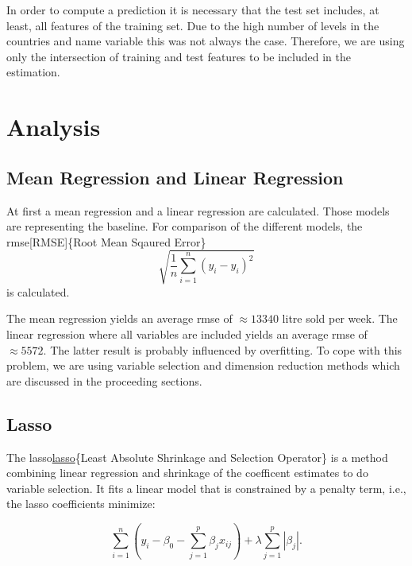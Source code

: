 \documentclass[11pt,]{article}
\begin{document}
In order to compute a prediction it is necessary that the test set
includes, at least, all features of the training set. Due to the high
number of levels in the countries and name variable this was not always
the case. Therefore, we are using only the intersection of training and
test features to be included in the estimation.

\hypertarget{analysis}{%
\section{Analysis}\label{analysis}}

\hypertarget{mean-regression-and-linear-regression}{%
\subsection{Mean Regression and Linear
Regression}\label{mean-regression-and-linear-regression}}

At first a mean regression and a linear regression are calculated. Those
models are representing the baseline. For comparison of the different
models, the \ac{rmse}{[}RMSE{]}\{Root Mean Sqaured Error\}
\[\sqrt{\frac{1}{n}\sum_{i = 1}^{n}\left(y_i-\hat{y}_i\right)^2}\] is
calculated.

The mean regression yields an average \ac{rmse} of \(\approx 13340\)
litre sold per week. The linear regression where all variables are
included yields an average \ac{rmse} of \(\approx 5572\). The latter
result is probably influenced by overfitting. To cope with this problem,
we are using variable selection and dimension reduction methods which
are discussed in the proceeding sections.

\hypertarget{lasso}{%
\subsection{Lasso}\label{lasso}}

The \ac{lasso}\protect\hyperlink{lasso}{lasso}\{Least Absolute Shrinkage
and Selection Operator\} is a method combining linear regression and
shrinkage of the coefficent estimates to do variable selection. It fits
a linear model that is constrained by a penalty term, i.e., the
\ac{lasso} coefficients minimize:

\[
\sum_{i=1}^{n}(y_i - \beta_0 - \sum_{j=1}^{p}\beta_jx_{ij})+\lambda\sum_{j=1}^{p}|\beta_j|.
\]
\end{document}
